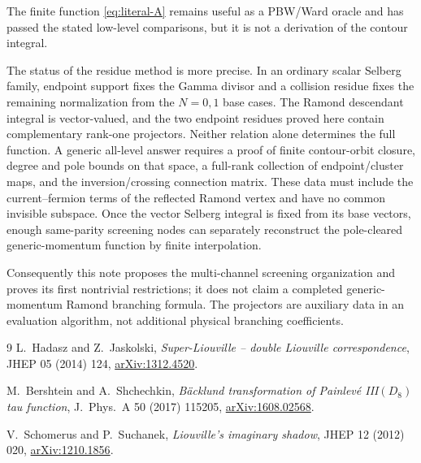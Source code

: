 \documentclass[11pt]{article}
\begin{document}
The finite function \eqref{eq:literal-A} remains useful as a PBW/Ward oracle
and has passed the stated low-level comparisons, but it is not a derivation
of the contour integral.

The status of the residue method is more precise.  In an ordinary scalar
Selberg family, endpoint support fixes the Gamma divisor and a collision
residue fixes the remaining normalization from the $N=0,1$ base cases.  The
Ramond descendant integral is vector-valued, and the two endpoint residues
proved here contain complementary rank-one projectors.  Neither relation
alone determines the full function.  A generic all-level answer requires a
proof of finite contour-orbit closure, degree and pole bounds on that space,
a full-rank collection of endpoint/cluster maps, and the inversion/crossing
connection matrix.  These data must include the current--fermion terms of
the reflected Ramond vertex and have no common invisible subspace.  Once
the vector Selberg integral is fixed from its base vectors, enough
same-parity screening nodes can separately reconstruct the pole-cleared
generic-momentum function by finite interpolation.

Consequently this note proposes the multi-channel screening organization
and proves its first nontrivial restrictions; it does not claim a completed
generic-momentum Ramond branching formula.  The projectors are auxiliary
data in an evaluation algorithm, not additional physical branching
coefficients.

\begin{thebibliography}{9}
L.~Hadasz and Z.~Jaskolski,
\emph{Super-Liouville -- double Liouville correspondence},
JHEP 05 (2014) 124,
\href{https://arxiv.org/abs/1312.4520}{arXiv:1312.4520}.

M.~Bershtein and A.~Shchechkin,
\emph{B\"acklund transformation of Painlev\'e III$(D_8)$ tau function},
J.~Phys.~A 50 (2017) 115205,
\href{https://arxiv.org/abs/1608.02568}{arXiv:1608.02568}.

V.~Schomerus and P.~Suchanek,
\emph{Liouville's imaginary shadow},
JHEP 12 (2012) 020,
\href{https://arxiv.org/abs/1210.1856}{arXiv:1210.1856}.
\end{thebibliography}
\end{document}
